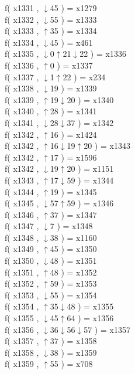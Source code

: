 f( x1331 , $\downarrow$45 ) = x1279 \\
f( x1332 , $\downarrow$55 ) = x1333 \\
f( x1333 , $\uparrow$35 ) = x1334 \\
f( x1334 , $\downarrow$45 ) = x461 \\
f( x1335 , $\downarrow$0$\uparrow$21$\downarrow$22 ) = x1336 \\
f( x1336 , $\uparrow$0 ) = x1337 \\
f( x1337 , $\downarrow$1$\uparrow$22 ) = x234 \\
f( x1338 , $\downarrow$19 ) = x1339 \\
f( x1339 , $\uparrow$19$\downarrow$20 ) = x1340 \\
f( x1340 , $\uparrow$28 ) = x1341 \\
f( x1341 , $\downarrow$28$\downarrow$37 ) = x1342 \\
f( x1342 , $\uparrow$16 ) = x1424 \\
f( x1342 , $\uparrow$16$\downarrow$19$\uparrow$20 ) = x1343 \\
f( x1342 , $\uparrow$17 ) = x1596 \\
f( x1342 , $\downarrow$19$\uparrow$20 ) = x1151 \\
f( x1343 , $\uparrow$17$\downarrow$59 ) = x1344 \\
f( x1344 , $\uparrow$19 ) = x1345 \\
f( x1345 , $\downarrow$57$\uparrow$59 ) = x1346 \\
f( x1346 , $\uparrow$37 ) = x1347 \\
f( x1347 , $\downarrow$7 ) = x1348 \\
f( x1348 , $\downarrow$38 ) = x1160 \\
f( x1349 , $\uparrow$45 ) = x1350 \\
f( x1350 , $\downarrow$48 ) = x1351 \\
f( x1351 , $\uparrow$48 ) = x1352 \\
f( x1352 , $\uparrow$59 ) = x1353 \\
f( x1353 , $\downarrow$55 ) = x1354 \\
f( x1354 , $\uparrow$35$\downarrow$48 ) = x1355 \\
f( x1355 , $\downarrow$45$\uparrow$64 ) = x1356 \\
f( x1356 , $\downarrow$36$\downarrow$56$\downarrow$57 ) = x1357 \\
f( x1357 , $\uparrow$37 ) = x1358 \\
f( x1358 , $\downarrow$38 ) = x1359 \\
f( x1359 , $\uparrow$55 ) = x708 \\
